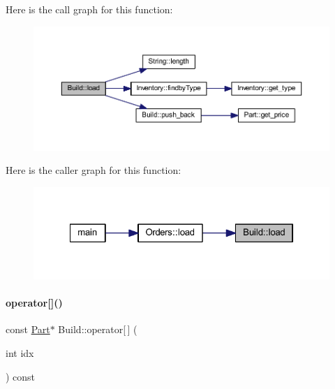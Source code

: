 Here is the call graph for this function\+:
\nopagebreak
\begin{figure}[H]
\begin{center}
\leavevmode
\includegraphics[width=350pt]{class_build_a754a988f73da756210b083814986f2f1_cgraph}
\end{center}
\end{figure}
Here is the caller graph for this function\+:
\nopagebreak
\begin{figure}[H]
\begin{center}
\leavevmode
\includegraphics[width=322pt]{class_build_a754a988f73da756210b083814986f2f1_icgraph}
\end{center}
\end{figure}
\mbox{\label{class_build_af3e03ed173016d7ff348d1e7057bd97c}} 
\paragraph{\texorpdfstring{operator[]()}{operator[]()}\hspace{0.1cm}{\footnotesize\ttfamily [1/2]}}
{\footnotesize\ttfamily const \mbox{\hyperlink{class_part}{Part}}$\ast$ Build\+::operator\mbox{[}$\,$\mbox{]} (\begin{DoxyParamCaption}\item[{int}]{idx }\end{DoxyParamCaption}) const\hspace{0.3cm}{\ttfamily [inline]}}

